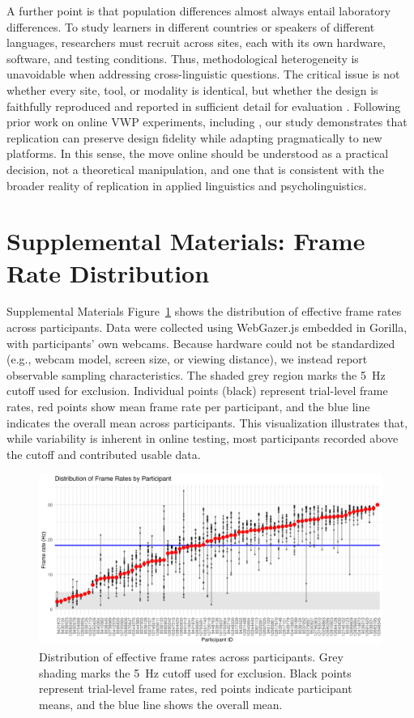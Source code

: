 \documentclass[sn-apa]{sn-jnl} %
\begin{document}
A further point is that population differences almost always entail laboratory
differences. To study learners in different countries or speakers of different
languages, researchers must recruit across sites, each with its own hardware,
software, and testing conditions. Thus, methodological heterogeneity is
unavoidable when addressing cross-linguistic questions. The critical issue is
not whether every site, tool, or modality is identical, but whether the design
is faithfully reproduced and reported in sufficient detail for evaluation
\parencite{mcmanus2024}. Following prior work on online VWP experiments,
including \textcite{AOW}, our study demonstrates that replication can
preserve design fidelity while adapting pragmatically to new platforms. In this
sense, the move online should be understood as a practical decision, not a theoretical manipulation, and one that is consistent with the broader reality of replication in applied linguistics and psycholinguistics.


\section{Supplemental Materials: Frame Rate Distribution}

\noindent
Supplemental Materials Figure~\ref{fig:frame_rate} shows the distribution of effective frame rates across participants. Data were collected using 
WebGazer.js embedded in Gorilla, with participants’ own webcams. Because hardware could not be standardized (e.g., webcam model, screen size, or viewing 
distance), we instead report observable sampling characteristics. The shaded grey region marks the 5~Hz cutoff used for exclusion. Individual points (black) 
represent trial-level frame rates, red points show mean frame rate per participant, and the blue line indicates the overall mean across participants. This visualization illustrates that, while variability is inherent in online testing, most participants recorded above the cutoff and contributed usable data.

\begin{figure}[h]
    \centering
    \includegraphics[width=\textwidth]{viz/fr.png}
    \caption{Distribution of effective frame rates across participants. Grey 
    shading marks the 5~Hz cutoff used for exclusion. Black points represent 
    trial-level frame rates, red points indicate participant means, and the 
    blue line shows the overall mean.}
    \label{fig:frame_rate}
\end{figure}
\end{document}
